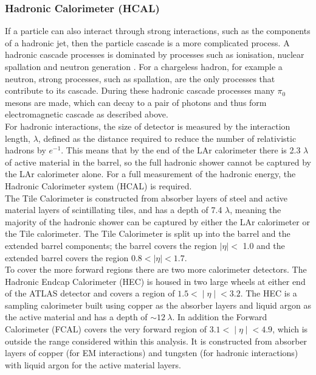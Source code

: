 \subsubsection{Hadronic Calorimeter (HCAL)}

If a particle can also interact through strong interactions, such as the components of a hadronic jet,
then the particle cascade is a more complicated process.
A hadronic cascade processes is dominated by processes such as
ionisation, nuclear spallation and neutron generation \cite{det-nuclearInt_book, det-thesis_kate}.
For a chargeless hadron, for example a neutron,
strong processes, such as spallation, are the only processes that contribute to its cascade.
During these hadronic cascade processes many $\pi_0$ mesons are made,
which can decay to a pair of photons and thus form electromagnetic cascade as described above. \\

For hadronic interactions, the size of detector is measured by the interaction length, $\lambda$,
defined as the distance required to reduce the number of relativistic hadrons by $e^{-1}$.
This means that by the end of the LAr calorimeter there is 2.3 $\lambda$ of active material in the barrel,
so the full hadronic shower cannot be captured by the LAr calorimeter alone.
For a full measurement of the hadronic energy, the Hadronic Calorimeter system (HCAL) is required. \\

The Tile Calorimeter is constructed from absorber layers of steel and active material layers of scintillating tiles,
and has a depth of 7.4 $\lambda$, meaning the majority of the hadronic shower can be captured by either the LAr calorimeter or the Tile calorimeter.
The Tile Calorimeter is split up into the barrel and the extended barrel components;
the barrel covers the region $|\eta| <$ 1.0 and the extended barrel covers the region $0.8 < |\eta| < 1.7$. \\

To cover the more forward regions there are two more calorimeter detectors.
The Hadronic Endcap Calorimeter (HEC) is housed in two large wheels at either end of the ATLAS detector
and covers a region of $1.5 < ∣\eta∣ < 3.2$.
The HEC is a sampling calorimeter built using copper as the absorber layers and liquid argon as the active material
and has a depth of $\sim 12~\lambda$.
In addition the Forward Calorimeter (FCAL) covers the very forward region of $3.1 < ∣\eta∣ < 4.9$,
which is outside the range considered within this analysis.
It is constructed from absorber layers of
copper (for EM interactions)
and tungsten (for hadronic interactions)
with liquid argon for the active material layers. \\


